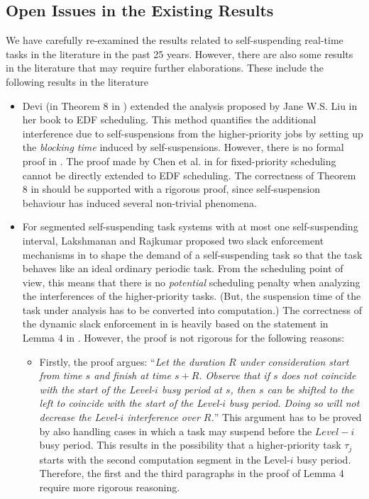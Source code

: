 \subsection{Open Issues in the Existing Results}
\label{sec:open-issues-existing}  
We have carefully re-examined the results related to self-suspending
real-time tasks in the literature in the past 25 years. However, there
are also some results in the literature that may require further
elaborations. These include the following results in the literature
\begin{itemize}
\item Devi (in Theorem 8 in \cite[Section
  4.5]{DBLP:conf/ecrts/Devi03}) extended the analysis proposed by Jane
  W.S. Liu in her book \cite[Page 164-165]{Liu:2000:RS:518501} to
  EDF scheduling. This method quantifies the additional interference
  due to self-suspensions from the higher-priority jobs by setting up
  the \emph{blocking time} induced by self-suspensions. However, there
  is no formal proof in \cite{DBLP:conf/ecrts/Devi03}. The proof made
  by Chen et al. in \cite{ChenHuangNelissen} for fixed-priority
  scheduling cannot be directly extended to EDF scheduling. The
  correctness of Theorem 8 in \cite[Section
  4.5]{DBLP:conf/ecrts/Devi03} should be supported with a rigorous
  proof, since self-suspension behaviour has induced several
  non-trivial phenomena.

\item For segmented self-suspending task systems with at most one
  self-suspending interval, Lakshmanan and Rajkumar proposed two slack
  enforcement mechanisms in \cite{LR:rtas10} to shape the demand of a
  self-suspending task so that the task behaves like an ideal ordinary
  periodic
  task.  From the scheduling point of view, this means that there is
  no \emph{potential} scheduling penalty when analyzing the interferences of the
  higher-priority tasks. (But, the suspension time of the task under
  analysis has to be converted into computation.) The correctness of the dynamic slack
  enforcement in \cite{LR:rtas10} is heavily based on the statement in Lemma
  4 in \cite{LR:rtas10}. However, the proof is not rigorous for the
  following reasons:
  \begin{itemize}
  \item Firstly, the proof argues: ``\emph{Let the duration $R$ under
    consideration start from time $s$ and finish at time $s +
    R$. Observe that if $s$ does not coincide with the start of the
    Level-$i$ busy period at $s$, then $s$ can be shifted to the left
    to coincide with the start of the Level-$i$ busy period. Doing so
    will not decrease the Level-$i$ interference over $R$.}'' This
    argument has to be proved by also handling cases in which a task
    may suspend before the $Level-i$ busy period. This results in the
    possibility that a higher-priority task $\tau_j$ starts with the
    second computation segment in the Level-$i$ busy
    period. Therefore, the first and the third paragraphs in the proof
    of Lemma 4 \cite{LR:rtas10} require more rigorous reasoning.


\end{itemize}
\end{itemize}
